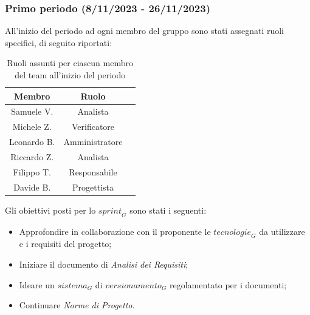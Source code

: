 \subsubsection{Primo periodo (8/11/2023 - 26/11/2023)}

All'inizio del periodo ad ogni membro del gruppo sono stati assegnati ruoli specifici, di seguito riportati:
\begin{table}[H]
\centering
\begin{tabular}{|c|c|c|}
\hline
\textbf{Membro} & \textbf{Ruolo} \\
\hline
Samuele V. & Analista \\
\hline
Michele Z. & Verificatore \\
\hline
Leonardo B. & Amministratore \\
\hline
Riccardo Z. & Analista \\
\hline
Filippo T. & Responsabile \\
\hline
Davide B. & Progettista \\
\hline
\end{tabular}
\caption{Ruoli assunti per ciascun membro del team all'inizio del periodo}
\end{table}
Gli obiettivi posti per lo $\textit{sprint}_G$ sono stati i seguenti:
\begin{itemize}
    \item Approfondire in collaborazione con il proponente le $\textit{tecnologie}_G$ da utilizzare e i requisiti del progetto;
    \item Iniziare il documento di \emph{Analisi dei Requisiti};
    \item Ideare un $\textit{sistema}_G$ di $\textit{versionamento}_G$ regolamentato per i documenti;
    \item Continuare \emph{Norme di Progetto}.
\end{itemize}

